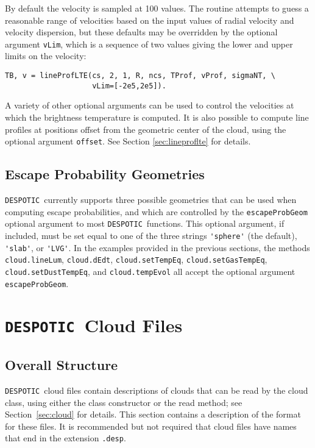 \documentclass[12pt]{article}
\newcommand{\despotic}{\texttt{DESPOTIC}}
\begin{document}
By default the velocity is sampled at 100 values. The routine attempts to guess a reasonable range of velocities based on the input values of radial velocity and velocity dispersion, but these defaults may be overridden by the optional argument \verb=vLim=, which is a sequence of two values giving the lower and upper limits on the velocity:
\begin{verbatim}
TB, v = lineProfLTE(cs, 2, 1, R, ncs, TProf, vProf, sigmaNT, \
                    vLim=[-2e5,2e5]).
\end{verbatim}
A variety of other optional arguments can be used to control the velocities at which the brightness temperature is computed. It is also possible to compute line profiles at positions offset from the geometric center of the cloud, using the optional argument \verb=offset=. See Section \ref{sec:lineproflte} for details.


\subsection{Escape Probability Geometries}
\label{sec:escapeprobgeom}

\despotic\ currently supports three possible geometries that can be used when computing escape probabilities, and which are controlled by the \verb=escapeProbGeom= optional argument to most \despotic\ functions. This optional argument, if included, must be set equal to one of the three strings \verb='sphere'= (the default), \verb='slab'=, or \verb='LVG'=. In the examples provided in the previous sections, the methods \verb=cloud.lineLum=, \verb=cloud.dEdt=, \verb=cloud.setTempEq=, \verb=cloud.setGasTempEq=, \verb=cloud.setDustTempEq=, and \verb=cloud.tempEvol= all accept the optional argument 
\verb=escapeProbGeom=.




\clearpage

\section{\despotic\ Cloud Files}
\label{sec:cloudfiles}

\subsection{Overall Structure}

\despotic\ cloud files contain descriptions of clouds that can be read by the cloud class, using either the class constructor or the read method; see Section~\ref{sec:cloud} for details. This section contains a description of the format for these files. It is recommended but not required that cloud files have names that end in the extension \verb=.desp=.
\end{document}
